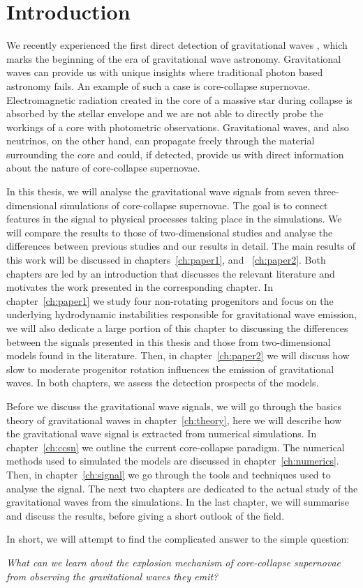 \chapter{Introduction}
We recently experienced the first direct detection of gravitational waves \citep{gw_detect},
which marks the beginning of the era of gravitational wave astronomy. Gravitational waves can provide us with 
unique insights where traditional photon based astronomy fails. An example of such a case is core-collapse supernovae. 
Electromagnetic radiation created in the core of a massive star during collapse is absorbed by the stellar
envelope and we are not able to directly probe the workings of a core with 
photometric observations. Gravitational waves, and also neutrinos, on the other hand, can
propagate freely through the material surrounding the core and could, if detected, provide us with
direct information about the nature of core-collapse supernovae.

In this thesis, we will analyse the gravitational wave signals
from seven three-dimensional simulations of core-collapse supernovae. 
The goal is to connect features in the signal
to physical processes taking place in the simulations. We will compare the results to
those of two-dimensional studies and analyse the differences between previous studies and our results in detail.
The main results of this work will be discussed in chapters~\ref{ch:paper1}, and ~\ref{ch:paper2}. 
Both chapters are led by an introduction that discusses the relevant literature and motivates the work presented in
the corresponding chapter.
In chapter~\ref{ch:paper1} we study four non-rotating progenitors and focus on the
underlying hydrodynamic instabilities responsible for gravitational wave emission,
we will also dedicate a large portion of this chapter to discussing the differences between
the signals presented in this thesis and those from two-dimensional models found in the literature.
Then, in chapter~\ref{ch:paper2} we will discuss how slow to moderate progenitor rotation influences the emission of
gravitational waves. In both chapters, we assess the detection prospects of the models.

Before we discuss the gravitational wave signals, we will go through the basics theory of gravitational waves in
chapter~\ref{ch:theory}, here we will describe how the gravitational wave signal is extracted from numerical simulations. 
In chapter~\ref{ch:ccsn} we outline the current core-collapse paradigm. The numerical
methods used to simulated the models are discussed in chapter~\ref{ch:numerics}. Then, in chapter~\ref{ch:signal}
we go through the tools and techniques used to analyse the signal. The next two chapters are dedicated to
the actual study of the gravitational waves from the simulations. In the last chapter, we will summarise and discuss
the results, before giving a short outlook of the field.

In short, we will attempt to find the 
complicated answer to the simple question:
\begin{displayquote}
\textit{What can we learn about the explosion mechanism of core-collapse supernovae
from observing the gravitational waves they emit?}
\end{displayquote}
